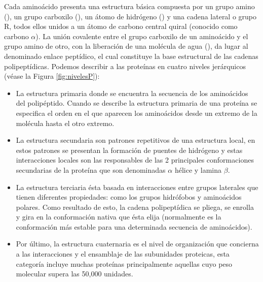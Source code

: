 Cada amino\'{a}cido presenta una estructura b\'{a}sica compuesta por un grupo amino (), un grupo carboxilo (), un \'{a}tomo de hidr\'{o}geno () y una cadena lateral o grupo R, todos ellos unidos a un \'{a}tomo de carbono central quiral (conocido como carbono \(\alpha\)). La uni\'{o}n covalente entre el grupo carboxilo de un amino\'{a}cido y el grupo amino de otro, con la liberaci\'{o}n de una mol\'{e}cula de agua (), da lugar al denominado enlace pept\'{i}dico, el cual constituye la base estructural de las cadenas polipept\'{i}dicas. Podemos describir a las prote\'{i}nas en cuatro niveles jer\'{a}rquicos (v\'{e}ase la Figura \ref{fig:nivelesP}):

\begin{itemize}

\item La estructura primaria donde se encuentra la secuencia de los
amino\'{a}cidos del polip\'{e}ptido. Cuando se describe la estructura primaria de una prote\'{i}na se especiﬁca el
orden en el que aparecen los amino\'{a}cidos desde un extremo de la mol\'{e}cula hasta el otro extremo.

\item La estructura secundaria son patrones repetitivos de una estructura local, en estos
patrones se presentan la formaci\'{o}n de puentes de hidr\'{o}geno y estas interacciones locales son las
responsables de las 2 principales conformaciones secundarias de la prote\'{i}na que son denominadas $\alpha$ h\'{e}lice y lamina $\beta$.


\item La estructura terciaria \'{e}sta basada en interacciones entre grupos laterales que tienen diferentes
propiedades: como los grupos hidr\'{o}fobos y amino\'{a}cidos polares. Como resultado de esto, la cadena
polipept\'{i}dica se pliega, se enrolla y gira en la conformaci\'{o}n nativa que \'{e}sta elija (normalmente es la conformaci\'{o}n m\'{a}s estable para una determinada secuencia de amino\'{a}cidos).


\item Por \'{u}ltimo, la estructura cuaternaria es el nivel de organizaci\'{o}n que concierna a las interacciones y el ensamblaje de las subunidades proteicas, esta categor\'{i}a incluye muchas prote\'{i}nas principalmente aquellas cuyo peso molecular supera las 50,000 unidades.

\end{itemize}

